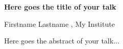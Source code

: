 \documentclass[12pt,twopage]{book}
\begin{document}

\textbf{Here goes the title of your talk}

Firstname Lastname , My Institute 


Here goes the abstract of your talk...

\end{document}
